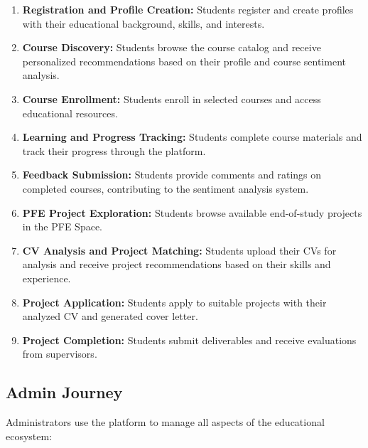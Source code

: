 \documentclass[12pt,a4paper]{report}
\begin{document}
\begin{enumerate}
    \item \textbf{Registration and Profile Creation:} Students register and create profiles with their educational background, skills, and interests.

    \item \textbf{Course Discovery:} Students browse the course catalog and receive personalized recommendations based on their profile and course sentiment analysis.

    \item \textbf{Course Enrollment:} Students enroll in selected courses and access educational resources.

    \item \textbf{Learning and Progress Tracking:} Students complete course materials and track their progress through the platform.

    \item \textbf{Feedback Submission:} Students provide comments and ratings on completed courses, contributing to the sentiment analysis system.

    \item \textbf{PFE Project Exploration:} Students browse available end-of-study projects in the PFE Space.

    \item \textbf{CV Analysis and Project Matching:} Students upload their CVs for analysis and receive project recommendations based on their skills and experience.

    \item \textbf{Project Application:} Students apply to suitable projects with their analyzed CV and generated cover letter.

    \item \textbf{Project Completion:} Students submit deliverables and receive evaluations from supervisors.
\end{enumerate}

\subsection{Admin Journey}

Administrators use the platform to manage all aspects of the educational ecosystem:
\end{document}
